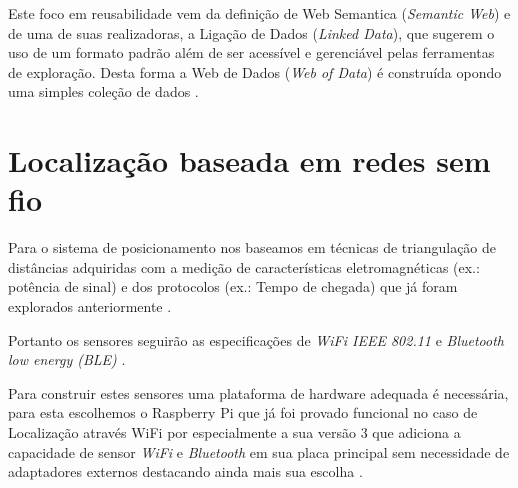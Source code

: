 Este foco em reusabilidade vem da definição de Web Semantica (\textit{Semantic
Web}) e de uma de suas realizadoras, a Ligação de Dados (\textit{Linked Data}),
que sugerem o uso de um formato padrão além de ser acessível e gerenciável pelas
ferramentas de exploração. Desta forma a Web de Dados (\textit{Web of Data}) é
construída opondo uma simples coleção de dados \cite{Bizer2009}.

\section{Localização baseada em redes sem fio}
\label{sec:Localização baseada em redes sem fio}

Para o sistema de posicionamento nos baseamos em técnicas de triangulação de
distâncias adquiridas com a medição de características eletromagnéticas (ex.:
potência de sinal) e dos protocolos (ex.: Tempo de chegada) que já foram
explorados anteriormente
\cite{Abusubaih2007} \cite{bahillo2009ieee} \cite{Feldmann2003}.


Portanto os sensores seguirão as especificações de \textit{WiFi IEEE 802.11}
\cite{Crow1997} e \textit{Bluetooth low energy (BLE)} \cite{Hossain2007}.


Para construir estes sensores uma plataforma de hardware adequada é necessária,
para esta escolhemos o Raspberry Pi \cite{Vujovic2014} \cite{Vujovic2015} que já
foi provado funcional no caso de Localização através WiFi por
 especialmente a sua versão 3 que adiciona a capacidade
de sensor \textit{WiFi} e \textit{Bluetooth} em sua placa principal sem
necessidade de adaptadores externos destacando ainda mais sua escolha
\cite{RPI2016}.
